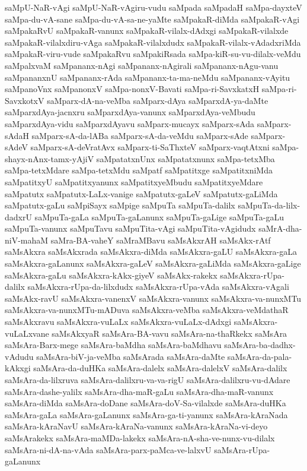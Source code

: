 {saMpU-NaR-vAgi
saMpU-NaR-vAgiru-vudu
saMpada
saMpadaH
saMpa-dayxteV
saMpa-du-vA-sane
saMpa-du-vA-sa-ne-yaMte
saMpakaR-diMda
saMpakaR-vAgi
saMpakaRvU
saMpakaR-vanunx
saMpakaR-vilalx-dAdxgi
saMpakaR-vilalxde
saMpakaR-vilalxdiru-vAga
saMpakaR-vilalxdudx
saMpakaR-vilalx-vAdadxriMda
saMpakaR-viru-vude
saMpakaRvu
saMpakiRsada
saMpa-kiR-su-vu-dilalx-veMdu
saMpalxvaM
saMpananx-nAgi
saMpananx-nAgirali
saMpananx-nAgu-vanu
saMpananxnU
saMpananx-rAda
saMpananx-ta-ma-neMdu
saMpananx-vAyitu
saMpanoVnx
saMpanonxV
saMpa-nonxV-Bavati
saMpa-ri-SavxkatxH
saMpa-ri-SavxkotxV
saMparx-dA-na-veMba
saMparx-dAya
saMparxdA-ya-daMte
saMparxdAya-jacnxru
saMparxdAya-vanunx
saMparxdAya-veMbudu
saMparxdAya-vidu
saMparxdAyavu
saMparx-mucayx
saMparx-sAda
saMparx-sAdaH
saMparx-sA-da-lABa
saMparx-sA-da-veMdu
saMparx-sAde
saMparx-sAdeV
saMparx-sA-deVratAvx
saMparx-ti-SaThxteV
saMparx-vaqtAtxni
saMpa-shayx-nAnx-tamx-yAjiV
saMpatatxnUnx
saMpatatxnunx
saMpa-tetxMba
saMpa-tetxMdare
saMpa-tetxMdu
saMpatf
saMpatitxge
saMpatitxniMda
saMpatitxyU
saMpatitxyanunx
saMpatitxyeMbudu
saMpatitxyeMdare
saMpatutx
saMpatutx-LaLx-vanige
saMpatutx-gaLeV
saMpatutx-gaLiMda
saMpatutx-gaLu
saMpiSayx
saMpige
saMpuTa
saMpuTa-dalilx
saMpuTa-da-lilx-dadxrU
saMpuTa-gaLa
saMpuTa-gaLanunx
saMpuTa-gaLige
saMpuTa-gaLu
saMpuTa-vanunx
saMpuTavu
saMpuTita-vAgi
saMpuTita-vAgidudx
saMrA-dha-niV-mahaM
saMra-BA-vaheY
saMraMBavu
saMsAkxrAH
saMsAkx-rAtf
saMsAkxra
saMsAkxrada
saMsAkxra-diMda
saMsAkxra-gaLU
saMsAkxra-gaLa
saMsAkxra-gaLanunx
saMsAkxra-gaLeV
saMsAkxra-gaLiMda
saMsAkxra-gaLige
saMsAkxra-gaLu
saMsAkxra-kAkx-giyeV
saMsAkx-rakekx
saMsAkxra-rUpa-dalilx
saMsAkxra-rUpa-da-lilxdudx
saMsAkxra-rUpa-vAda
saMsAkxra-vAgali
saMsAkx-ravU
saMsAkxra-vanenxV
saMsAkxra-vanunx
saMsAkxra-va-nunxMTu
saMsAkxra-va-nunxMTu-mADuva
saMsAkxra-veMba
saMsAkxra-veMdathaR
saMsAkxravu
saMsAkxra-vuLaLx
saMsAkxra-vuLaLx-dAdxgi
saMsAkxra-vuLaLxvane
saMsAkxyaR
saMsAra-BA-vavu
saMsAra-na-thaRkekx
saMsAra
saMsAra-Barx-mege
saMsAra-baMdha
saMsAra-baMdhavu
saMsAra-ba-dadhx-vAdudu
saMsAra-biV-ja-veMba
saMsArada
saMsAra-daMte
saMsAra-da-pala-kAkxgi
saMsAra-da-duHKa
saMsAra-dalelx
saMsAra-dalelxV
saMsAra-dalilx
saMsAra-da-lilxruva
saMsAra-dalilxru-va-va-rigU
saMsAra-dalilxru-vu-dAdare
saMsAra-dashe-yalilx
saMsAra-dha-maR-gaLu
saMsAra-dha-maR-vanunx
saMsAra-diMda
saMsAra-doDane
saMsAra-doV-Sa-vilalxde
saMsAra-duHKa
saMsAra-gaLa
saMsAra-gaLanunx
saMsAra-ga-ti-yanunx
saMsAra-kAraNada
saMsAra-kAraNavU
saMsAra-kAraNa-vanunx
saMsAra-kAraNa-vi-deyo
saMsArakekx
saMsAra-maMDa-lakekx
saMsAra-nA-sha-ve-nunx-vu-dilalx
saMsAra-ni-dA-na-vAda
saMsAra-parx-paMca-ve-lalxvU
saMsAra-rUpa-gaLanunx
}
